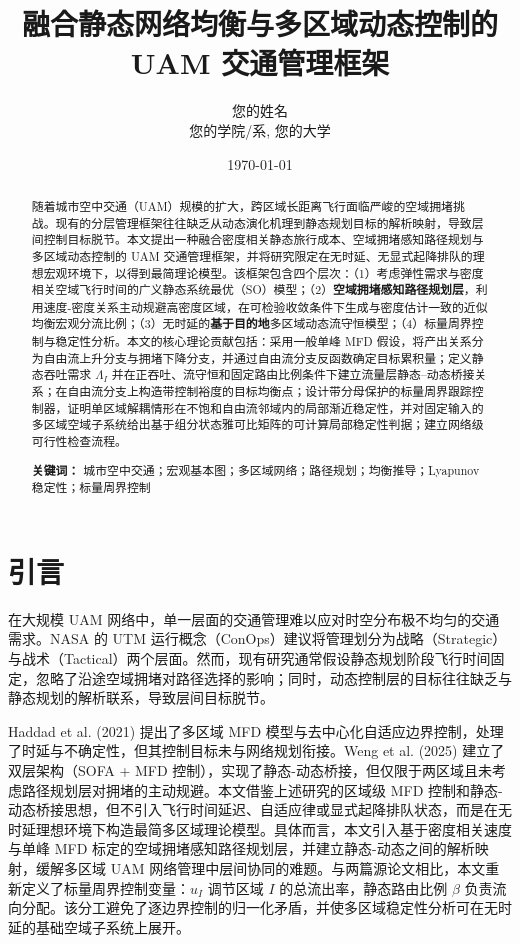 \documentclass[a4paper,12pt]{article}
\title{\textbf{融合静态网络均衡与多区域动态控制的 UAM 交通管理框架}}
\author{您的姓名 \\ 您的学院/系, 您的大学}
\date{\today}
\theoremstyle{plain}
\theoremstyle{definition}
\theoremstyle{remark}
\begin{document}
\maketitle

\begin{abstract}
随着城市空中交通（UAM）规模的扩大，跨区域长距离飞行面临严峻的空域拥堵挑战。现有的分层管理框架往往缺乏从动态演化机理到静态规划目标的解析映射，导致层间控制目标脱节。本文提出一种融合密度相关静态旅行成本、空域拥堵感知路径规划与多区域动态控制的 UAM 交通管理框架，并将研究限定在无时延、无显式起降排队的理想宏观环境下，以得到最简理论模型。该框架包含四个层次：（1）考虑弹性需求与密度相关空域飞行时间的广义静态系统最优（SO）模型；（2）\textbf{空域拥堵感知路径规划层}，利用速度-密度关系主动规避高密度区域，在可检验收敛条件下生成与密度估计一致的近似均衡宏观分流比例；（3）无时延的\textbf{基于目的地}多区域动态流守恒模型；（4）标量周界控制与稳定性分析。本文的核心理论贡献包括：采用一般单峰 MFD 假设，将产出关系分为自由流上升分支与拥堵下降分支，并通过自由流分支反函数确定目标累积量；定义静态吞吐需求 $\Lambda_I$ 并在正吞吐、流守恒和固定路由比例条件下建立流量层静态--动态桥接关系；在自由流分支上构造带控制裕度的目标均衡点；设计带分母保护的标量周界跟踪控制器，证明单区域解耦情形在不饱和自由流邻域内的局部渐近稳定性，并对固定输入的多区域空域子系统给出基于组分状态雅可比矩阵的可计算局部稳定性判据；建立网络级可行性检查流程。

\textbf{关键词：} 城市空中交通；宏观基本图；多区域网络；路径规划；均衡推导；Lyapunov 稳定性；标量周界控制
\end{abstract}

\section{引言}
在大规模 UAM 网络中，单一层面的交通管理难以应对时空分布极不均匀的交通需求。NASA 的 UTM 运行概念（ConOps）建议将管理划分为战略（Strategic）与战术（Tactical）两个层面。然而，现有研究通常假设静态规划阶段飞行时间固定，忽略了沿途空域拥堵对路径选择的影响；同时，动态控制层的目标往往缺乏与静态规划的解析联系，导致层间目标脱节。

Haddad et al. (2021) 提出了多区域 MFD 模型与去中心化自适应边界控制，处理了时延与不确定性，但其控制目标未与网络规划衔接。Weng et al. (2025) 建立了双层架构（SOFA + MFD 控制），实现了静态-动态桥接，但仅限于两区域且未考虑路径规划层对拥堵的主动规避。本文借鉴上述研究的区域级 MFD 控制和静态-动态桥接思想，但不引入飞行时间延迟、自适应律或显式起降排队状态，而是在无时延理想环境下构造最简多区域理论模型。具体而言，本文引入基于密度相关速度与单峰 MFD 标定的空域拥堵感知路径规划层，并建立静态-动态之间的解析映射，缓解多区域 UAM 网络管理中层间协同的难题。与两篇源论文相比，本文重新定义了标量周界控制变量：$u_I$ 调节区域 $I$ 的总流出率，静态路由比例 $\beta$ 负责流向分配。该分工避免了逐边界控制的归一化矛盾，并使多区域稳定性分析可在无时延的基础空域子系统上展开。
\end{document}
